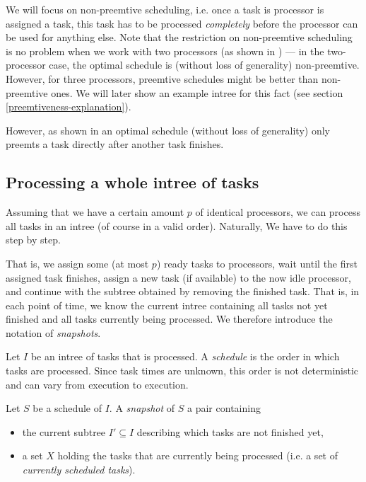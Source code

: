 We will focus on non-preemtive scheduling, i.e. once a task is processor is assigned a task, this task has to be processed \emph{completely} before the processor can be used for anything else. Note that the restriction on non-preemtive scheduling is no problem when we work with two processors (as shown in \cite{chandyreynoldslargepaper1979}) --- in the two-processor case, the optimal schedule is (without loss of generality) non-preemtive. However, for three processors, preemtive schedules might be better than non-preemtive ones. We will later show an example intree for this fact (see section \ref{preemtiveness-explanation}).

However, as shown in \cite{chandyreynoldslargepaper1979} an optimal schedule (without loss of generality) only preemts a task directly after another task finishes.

\subsection{Processing a whole intree of tasks}
\label{sec:processing-an-intree-of-tasks}

Assuming that we have a certain amount $p$ of identical processors, we can process all tasks in an intree (of course in a valid order). Naturally, We have to do this step by step. 

That is, we assign some (at most $p$) ready tasks to processors, wait until the first assigned task finishes, assign a new task (if available) to the now idle processor, and continue with the subtree obtained by removing the finished task. That is, in each point of time, we know the current intree containing all tasks not yet finished and all tasks currently being processed. We therefore introduce the notation of \emph{snapshots}.

\begin{definition}  
  Let $I$ be an intree of tasks that is processed. A \emph{schedule} is the order in which tasks are processed. Since task times are unknown, this order is not deterministic and can vary from execution to execution.

  Let $S$ be a schedule of $I$.
  A \emph{snapshot} of $S$ a pair containing
  \begin{itemize}
  \item the current subtree $I'\subseteq I$ describing which tasks are not finished yet,
  \item a set $X$ holding the tasks that are currently being processed (i.e. a set of \emph{currently scheduled tasks}).
  \end{itemize}
\end{definition}

